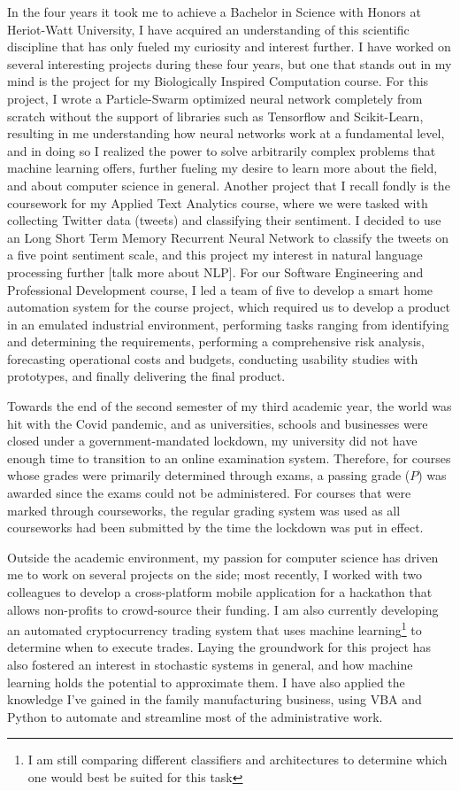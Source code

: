 \documentclass[a4paper,11pt]{article}
\newcommand{\hw}{Heriot-Watt University}
\begin{document}
In the four years it took me to achieve a Bachelor in Science with Honors at \hw, I have acquired an understanding of this scientific discipline that has only fueled my curiosity and interest further. I have worked on several interesting projects during these four years, but one that stands out in my mind is the project for my Biologically Inspired Computation course. For this project, I wrote a Particle-Swarm optimized neural network completely from scratch without the support of libraries such as Tensorflow and Scikit-Learn, resulting in me understanding how neural networks work at a fundamental level, and in doing so I realized the power to solve arbitrarily complex problems that machine learning offers, further fueling my desire to learn more about the field, and about computer science in general. Another project that I recall fondly is the coursework for my Applied Text Analytics course, where we were tasked with collecting Twitter data (tweets) and classifying their sentiment. I decided to use an Long Short Term Memory Recurrent Neural Network to classify the tweets on a five point sentiment scale, and this project my interest in natural language processing further [talk more about NLP]. For our Software Engineering and Professional Development course, I led a team of five to develop a smart home automation system for the course project, which required us to develop a product in an emulated industrial environment, performing tasks ranging from identifying and determining the requirements, performing a comprehensive risk analysis, forecasting operational costs and budgets, conducting usability studies with prototypes, and finally delivering the final product.

Towards the end of the second semester of my third academic year, the world was hit with the Covid pandemic, and as universities, schools and businesses were closed under a government-mandated lockdown, my university did not have enough time to transition to an online examination system. Therefore, for courses whose grades were primarily determined through exams, a passing grade ($P$) was awarded since the exams could not be administered. For courses that were marked through courseworks, the regular grading system was used as all courseworks had been submitted by the time the lockdown was put in effect.

Outside the academic environment, my passion for computer science has driven me to work on several projects on the side; most recently, I worked with two colleagues to develop a cross-platform mobile application for a hackathon that allows non-profits to crowd-source their funding. I am also currently developing an automated cryptocurrency trading system that uses machine learning\footnote{I am still comparing different classifiers and architectures to determine which one would best be suited for this task} to determine when to execute trades. Laying the groundwork for this project has also fostered an interest in stochastic systems in general, and how machine learning holds the potential to approximate them. I have also applied the knowledge I've gained in the family manufacturing business, using VBA and Python to automate and streamline most of the administrative work.
\end{document}
